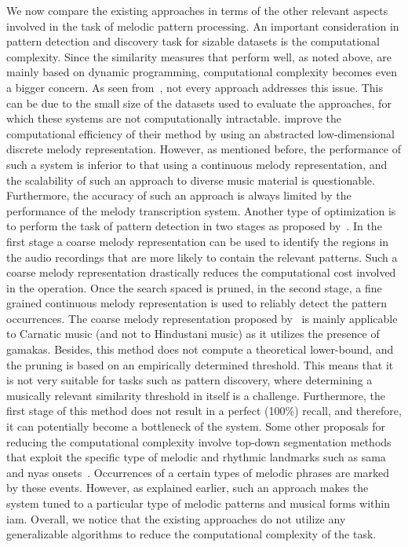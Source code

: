 We now compare the existing approaches in terms of the other relevant aspects involved in the task of melodic pattern processing. An important consideration in pattern detection and discovery task for sizable datasets is the computational complexity. Since the similarity measures that perform well, as noted above, are mainly based on dynamic programming, computational complexity becomes even a bigger concern. As seen from~, not every approach addresses this issue. This can be due to the small size of the datasets used to evaluate the approaches, for which these systems are not computationally intractable. \cite{ganguli2015efficient} improve the computational efficiency of their method by using an abstracted low-dimensional discrete melody representation. However, as mentioned before, the performance of such a system is inferior to that using a continuous melody representation, and the scalability of such an approach to diverse music material is questionable. Furthermore, the accuracy of such an approach is always limited by the performance of the melody transcription system. Another type of optimization is to perform the task of pattern detection in two stages as proposed by~\cite{dutta2014modified,Ishwar2013}. In the first stage a coarse melody representation can be used to identify the regions in the audio recordings that are more likely to contain the relevant patterns. Such a coarse melody representation drastically reduces the computational cost involved in the operation. Once the search spaced is pruned, in the second stage, a fine grained continuous melody representation is used to reliably detect the pattern occurrences. The coarse melody representation proposed by~\cite{Ishwar2013} is mainly applicable to Carnatic music (and not to Hindustani music) as it utilizes the presence of \glspl{gamaka}. Besides, this method does not compute a theoretical lower-bound, and the pruning is based on an empirically determined threshold. This means that it is not very suitable for tasks such as pattern discovery, where determining a musically relevant similarity threshold in itself is a challenge. Furthermore, the first stage of this method does not result in a perfect (100\%) recall, and therefore, it can potentially become a bottleneck of the system. Some other proposals for reducing the computational complexity involve top-down segmentation methods that exploit the specific type of melodic and rhythmic landmarks such as \gls{sama} and \gls{nyas} onsets~\citep{Ross2012,Ross2012b}. Occurrences of a certain types of melodic phrases are marked by these events. However, as explained earlier, such an approach makes the system tuned to a particular type of melodic patterns and musical forms within \gls{iam}. Overall, we notice that the existing approaches do not utilize any generalizable algorithms to reduce the computational complexity of the task. 

